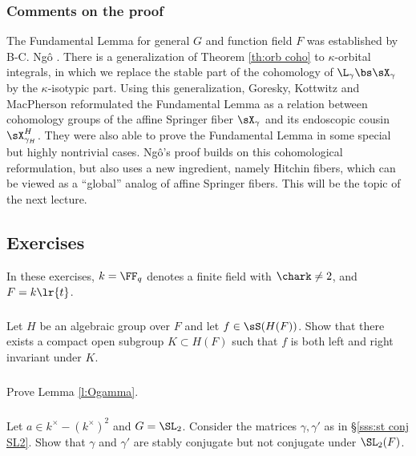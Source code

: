 \subsubsection{Comments on the proof} The Fundamental Lemma for general $G$ and function field $F$ was established by B-C. Ng\^o \cite{NgoFL}. There is a generalization of Theorem \ref{th:orb coho} to $\kappa$-orbital integrals, in which we replace the stable part of the cohomology of $\L_{\gamma}\bs\sX_{\gamma}$ by the $\kappa$-isotypic part. Using this generalization, Goresky, Kottwitz and MacPherson \cite{GKM} reformulated the Fundamental Lemma as a relation between cohomology groups of the affine Springer fiber $\sX_{\gamma}$ and its endoscopic cousin $\sX^{H}_{\gamma_{H}}$. They were also able to prove the Fundamental Lemma in some special but highly nontrivial cases. Ng\^o's proof builds on this cohomological reformulation, but also uses a new ingredient, namely Hitchin fibers, which can be viewed as a ``global'' analog of affine Springer fibers. This will be the topic of the next lecture.  


\subsection{Exercises}

In these exercises, $k=\FF_{q}$ denotes a finite field with $\chark\neq2$, and $F=k\lr{t}$.


\subsubsection{}\label{exIII:K inv} Let $H$ be an algebraic group over $F$ and let $f\in\sS(H(F))$. Show that there exists a compact open subgroup $K\subset H(F)$ such that $f$ is both left and right invariant under $K$.

\subsubsection{}\label{exIII:Ogamma} Prove Lemma \ref{l:Ogamma}.


\subsubsection{}\label{exIII:stable conj} Let $a\in k^{\times}-(k^{\times})^{2}$ and $G=\SL_{2}$. Consider the matrices $\gamma,\gamma'$ as in \S\ref{sss:st conj SL2}. Show that  $\gamma$ and $\gamma'$ are stably conjugate but not conjugate under $\SL_{2}(F)$.


